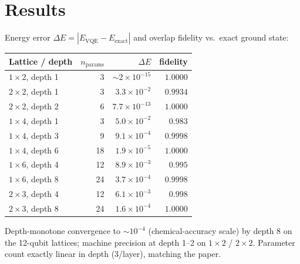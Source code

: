 \documentclass[11pt]{article}
\begin{document}
\section{Results}
Energy error $\Delta E = |E_{\text{VQE}} - E_{\text{exact}}|$ and overlap
fidelity vs.\ exact ground state:
\begin{center}
\begin{tabular}{lrrr}
\toprule
Lattice / depth & $n_{\text{params}}$ & $\Delta E$ & fidelity \\
\midrule
$1{\times}2$, depth 1 & 3  & $\sim2\!\times\!10^{-15}$ & $1.0000$ \\
$2{\times}2$, depth 1 & 3  & $3.3\!\times\!10^{-2}$   & $0.9934$ \\
$2{\times}2$, depth 2 & 6  & $7.7\!\times\!10^{-13}$  & $1.0000$ \\
$1{\times}4$, depth 1 & 3  & $5.0\!\times\!10^{-2}$   & $0.983$  \\
$1{\times}4$, depth 3 & 9  & $9.1\!\times\!10^{-4}$   & $0.9998$ \\
$1{\times}4$, depth 6 & 18 & $1.9\!\times\!10^{-5}$   & $1.0000$ \\
$1{\times}6$, depth 4 & 12 & $8.9\!\times\!10^{-3}$   & $0.995$  \\
$1{\times}6$, depth 8 & 24 & $3.7\!\times\!10^{-4}$   & $0.9998$ \\
$2{\times}3$, depth 4 & 12 & $6.1\!\times\!10^{-3}$   & $0.998$  \\
$2{\times}3$, depth 8 & 24 & $1.6\!\times\!10^{-4}$   & $1.0000$ \\
\bottomrule
\end{tabular}
\end{center}
Depth-monotone convergence to $\sim 10^{-4}$ (chemical-accuracy scale) by
depth 8 on the 12-qubit lattices; machine precision at depth 1--2 on
$1{\times}2$ / $2{\times}2$. Parameter count exactly linear in depth
(3/layer), matching the paper.
\end{document}
